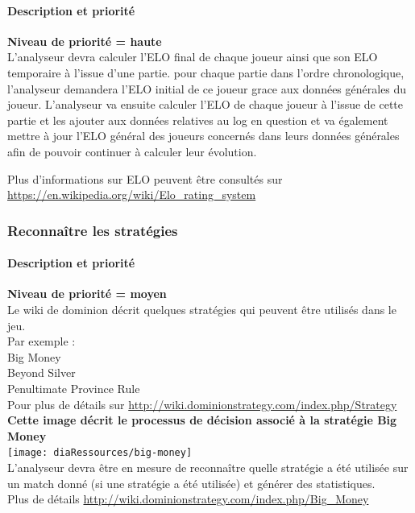 \paragraph*{Description et priorité}
\textbf{Niveau de priorité = haute}\\

L'analyseur devra calculer l'ELO final de chaque joueur ainsi que son ELO temporaire à l'issue d'une partie.\newline
pour chaque partie dans l'ordre chronologique, l'analyseur demandera l'ELO initial de ce joueur grace aux données générales du joueur. L'analyseur va ensuite calculer l'ELO de chaque joueur à l'issue de cette partie et les ajouter aux données relatives au log en question et va également mettre à jour l'ELO général des joueurs concernés dans leurs données générales afin de pouvoir continuer à calculer leur évolution.

Plus d'informations sur ELO peuvent être consultés sur \url{https://en.wikipedia.org/wiki/Elo_rating_system}\\

\subsubsection{Reconnaître les stratégies}
\paragraph*{Description et priorité}
\textbf{Niveau de priorité = moyen}\\

Le wiki de dominion décrit quelques stratégies qui peuvent être utilisés dans le jeu.\\Par exemple :\\
Big Money\\
Beyond Silver\\
Penultimate Province Rule\\
Pour plus de détails sur \url{http://wiki.dominionstrategy.com/index.php/Strategy}\\



\textbf{Cette image décrit le processus de décision associé à la stratégie Big Money}\\
\texttt{[image: diaRessources/big-money]}\\
L'analyseur devra être en mesure de reconnaître quelle stratégie a été utilisée sur un match donné (si une  stratégie a été utilisée) et générer des statistiques.\\
Plus de détails \url{http://wiki.dominionstrategy.com/index.php/Big_Money}\\

